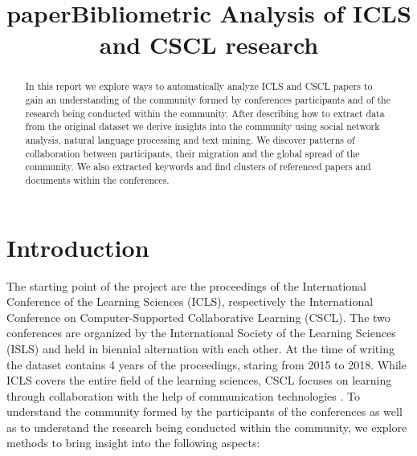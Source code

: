 \documentclass[journal,twocolumn]{IEEEtran}
\title{paper}
\begin{document}
    
    
    
\renewcommand{\figurename}{Figure}
\captionsetup{labelformat=simple}\title{Bibliometric Analysis of ICLS and CSCL research}
\author{\par
}
\maketitle

    
    

    

\begin{abstract}
    In this report we explore ways to automatically analyze ICLS and CSCL
papers to gain an understanding of the community formed by conferences
participants and of the research being conducted within the community.
After describing how to extract data from the original dataset we derive
insights into the community using social network analysis, natural
language processing and text mining. We discover patterns of
collaboration between participants, their migration and the global
spread of the community. We also extracted keywords and find clusters of
referenced papers and documents within the conferences.
\end{abstract}
    \section{Introduction}\label{introduction}

The starting point of the project are the proceedings of the
International Conference of the Learning Sciences (ICLS), respectively
the International Conference on Computer-Supported Collaborative
Learning (CSCL). The two conferences are organized by the International
Society of the Learning Sciences (ISLS) and held in biennial alternation
with each other. At the time of writing the dataset contains 4 years of
the proceedings, staring from 2015 to 2018. While ICLS covers the entire
field of the learning sciences, CSCL focuses on learning through
collaboration with the help of communication technologies \cite{ICLS}.
To understand the community formed by the participants of the
conferences as well as to understand the research being conducted within
the community, we explore methods to bring insight into the following
aspects:
\end{document}
